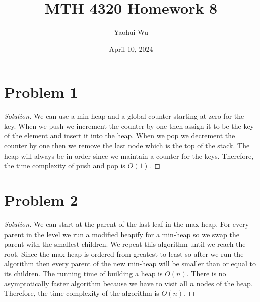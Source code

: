 \documentclass[12pt]{article}
\title{MTH 4320 Homework 8}
\author{Yaohui Wu}
\date{April 10, 2024}
\newenvironment*{solution}{\begin{proof}[Solution]}{\end{proof}}
\begin{document}
\maketitle
\section*{Problem 1}
\begin{solution}
    We can use a min-heap and a global counter starting at zero for the key.
    When we push we increment the counter by one then assign it to be the key
    of the element and insert it into the heap. When we pop we decrement the
    counter by one then we remove the last node which is the top of the stack.
    The heap will always be in order since we maintain a counter for the keys.
    Therefore, the time complexity of push and pop is \(O(1)\).
\end{solution}
\section*{Problem 2}
\begin{solution}
    We can start at the parent of the last leaf in the max-heap. For every
    parent in the level we run a modified heapify for a min-heap so we swap
    the parent with the smallest children. We repeat this algorithm until we
    reach the root. Since the max-heap is ordered from greatest to least so
    after we run the algorithm then every parent of the new min-heap will be
    smaller than or equal to its children. The running time of building a heap
    is \(O(n)\). There is no asymptotically faster algorithm because we have
    to visit all \(n\) nodes of the heap. Therefore, the time complexity of
    the algorithm is \(O(n)\).
\end{solution}
\end{document}
